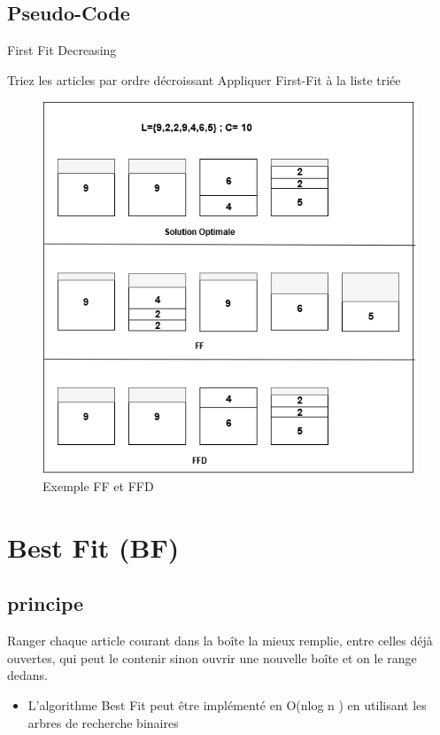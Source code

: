 \documentclass[class=article, crop=false]{standalone}
\begin{document}
\subsection{Pseudo-Code}
\begin{algorithm}
    \caption{First Fit Decreasing }
    \begin{algorithmic}
        \STATE Triez les articles par ordre décroissant
        \STATE Appliquer First-Fit à la liste triée 
    \end{algorithmic}
\end{algorithm}

\begin{figure}[H]
    \includegraphics[width=\linewidth]{../figures/FF FFD.png}
    \caption{Exemple FF et FFD}
\end{figure}

\section{Best Fit (BF)}
\subsection{principe}
Ranger chaque article courant dans la boîte la mieux remplie, entre celles déjà ouvertes, qui peut le contenir sinon ouvrir une nouvelle boîte et on le range dedans.
\begin{itemize}
    \item L’algorithme Best Fit peut être implémenté en O(nlog n ) en utilisant les arbres de recherche binaires
\end{itemize}
\end{document}
